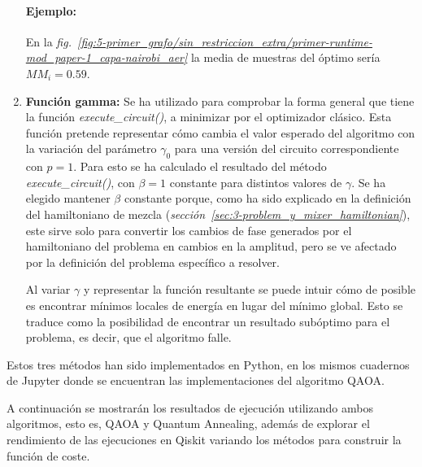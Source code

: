 \begin{enumerate}
  \paragraph{Ejemplo:}
  En la \textit{fig.~\ref{fig:5-primer_grafo/sin_restriccion_extra/primer-runtime-mod_paper-1_capa-nairobi_aer}} la media de muestras del óptimo sería $\textit{MM}_i = 0.59$.
  
\item \textbf{Función gamma:}
  Se ha utilizado para comprobar la forma general que tiene la función \textit{execute\_circuit()}, a minimizar por el optimizador clásico.
  Esta función pretende representar cómo cambia el valor esperado del algoritmo con la variación del parámetro $\gamma_0$ para una versión del circuito correspondiente con $p = 1$.
  Para esto se ha calculado el resultado del método \textit{execute\_circuit()}, con $\beta = 1$ constante para distintos valores de $\gamma$.
  Se ha elegido mantener $\beta$ constante porque, como ha sido explicado en la definición del hamiltoniano de mezcla (\textit{sección~\ref{sec:3-problem_y_mixer_hamiltonian}}), este sirve solo para convertir los cambios de fase generados por el hamiltoniano del problema en cambios en la amplitud, pero se ve afectado por la definición del problema específico a resolver.

  Al variar \(\gamma\) y representar la función resultante se puede intuir cómo de posible es encontrar mínimos locales de energía en lugar del mínimo global.
  Esto se traduce como la posibilidad de encontrar un resultado subóptimo para el problema, es decir, que el algoritmo falle.
\end{enumerate}

Estos tres métodos han sido implementados en Python, en los mismos cuadernos de Jupyter donde se encuentran las implementaciones del algoritmo QAOA\cite{codigo_tfg}.

A continuación se mostrarán los resultados de ejecución utilizando ambos algoritmos, esto es, QAOA y Quantum Annealing, además de explorar el rendimiento de las ejecuciones en Qiskit variando los métodos para construir la función de coste.


